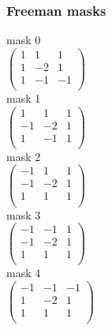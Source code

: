 \documentclass[a4paper]{article}
\begin{document}
\subsubsection{Freeman masks}

mask 0 \\

\begin{math}
   \begin{pmatrix} 
   1 & 1 & 1 \\ 
   1 & -2 & 1 \\
   1 & -1 & -1 \\ 
   \end{pmatrix}
\end{math}\\

mask 1 \\

\begin{math}
   \begin{pmatrix} 
   1 & 1 & 1 \\ 
   -1 & -2 & 1 \\
   1 & -1 & 1 \\ 
   \end{pmatrix}
\end{math}\\

mask 2 \\

\begin{math}
   \begin{pmatrix} 
   -1 & 1 & 1 \\ 
   -1 & -2 & 1 \\
   1 & 1 & 1 \\ 
   \end{pmatrix}
\end{math}\\

mask 3 \\

\begin{math}
   \begin{pmatrix} 
   -1 & -1 & 1 \\ 
   -1 & -2 & 1 \\
   1 & 1 & 1 \\ 
   \end{pmatrix}
\end{math}\\

mask 4 \\

\begin{math}
   \begin{pmatrix} 
   -1 & -1 & -1 \\ 
   1 & -2 & 1 \\
   1 & 1 & 1 \\ 
   \end{pmatrix}
\end{math}\\
\end{document}
